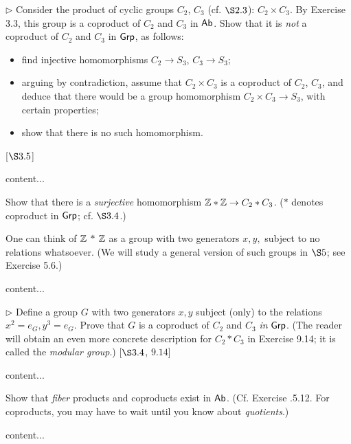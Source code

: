 \begin{exercise}
	$\triangleright$ Consider the product of cyclic groups $C_2$, $C_3$ (cf. $\S 2.3$): $C_2\times C_3$. By Exercise 3.3, this group is a coproduct of $C_2$ and $C_3$ in $\textsf{Ab}$. Show that it is \emph{not} a coproduct of $C_2$ and $C_3$ in $\textsf{Grp}$, as follows:
	\begin{itemize}
		\item find injective homomorphisms $C_2 \to S_3$, $C_3 \to S_3$;
		\item arguing by contradiction, assume that $C_2\times C_3$ is a coproduct of $C_2$, $C_3$, and deduce that there would be a group homomorphism $C_2\times C_3 \to S_3$, with certain properties;
		\item show that there is no such homomorphism.
	\end{itemize}
	[$\S 3.5$]
\end{exercise}
\begin{solution}
	content...
\end{solution}

\begin{exercise}
	Show that there is a \emph{surjective} homomorphism $\mathbb{Z} \ast \mathbb{Z} \to C_2 \ast C_3$. ($\ast$ denotes coproduct in $\textsf{Grp}$; cf. $\S 3.4$.)
	
	One can think of $\mathbb{Z}$ $\ast$ $\mathbb{Z}$ as a group with two generators $x, y,$ subject to no relations whatsoever. (We will study a general version of such groups in $\S 5$; see Exercise 5.6.)
\end{exercise}
\begin{solution}
	content...
\end{solution}

\begin{exercise}
	$\triangleright$ Define a group $G$ with two generators $x,y$ subject (only) to the relations $x^2 = e_G, y^3 = e_G$. Prove that $G$ is a coproduct of $C_2$ and $C_3$ \emph{in} $\textsf{Grp}$. (The reader will obtain an even more concrete description for $C_2\ast C_3$ in Exercise 9.14; it is called the \emph{modular group}.) [$\S 3.4$, $9.14$]
\end{exercise}
\begin{solution}
	content...
\end{solution}

\begin{exercise}
	Show that \emph{fiber} products and coproducts exist in $\textsf{Ab}$. (Cf. Exercise .5.12. For coproducts, you may have to wait until you know about \emph{quotients}.)
\end{exercise}
\begin{solution}
	content...
\end{solution}